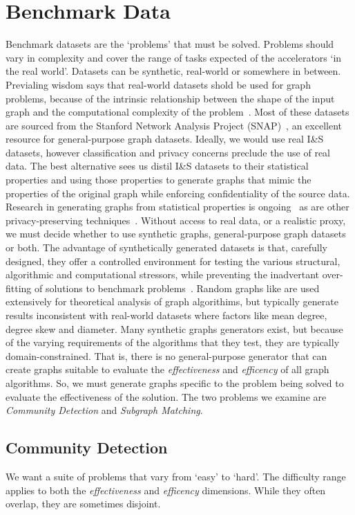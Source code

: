 \section{Benchmark Data}\label{section:datasets}
Benchmark datasets are the `problems' that must be solved.
Problems should vary in complexity and cover the range of tasks expected of the accelerators `in the real world'.
Datasets can be synthetic, real-world or somewhere in between.
Previaling wisdom says that real-world datasets shold be used for graph problems, because of the intrinsic relationship between the shape of the input graph and the computational complexity of the problem~\cite{Beamer2017}.
Most of these datasets are sourced from the Stanford Network Analysis Project (SNAP)~\cite{Leskovec2014}, an excellent resource for general-purpose graph datasets.
Ideally, we would use real I\&S datasets, however classification and privacy concerns preclude the use of real data. 
The best alternative sees us distil I\&S datasets to their statistical properties and using those properties to generate graphs that mimic the properties of the original graph while enforcing confidentiality of the source data. 
Research in generating graphs from statistical properties is ongoing~ as are other privacy-preserving techniques~.
Without access to real data, or a realistic proxy, we must decide whether to use synthetic graphs, general-purpose graph datasets or both. 
The advantage of synthetically generated datasets is that, carefully designed, they offer a controlled environment for testing the various structural, algorithmic and computational stressors, while preventing the inadvertant over-fitting of solutions to benchmark problems~\cite{Hooker1994,Hooker1995}. 
Random graphs like  are used extensively for theoretical analysis of graph algorithims, but typically generate results inconsistent with real-world datasets where factors like mean degree, degree skew and diameter. 
Many synthetic graphs generators exist, but because of the varying requirements of the algorithms that they test, they are typically domain-constrained. 
That is, there is no general-purpose generator that can create graphs suitable to evaluate the \textit{effectiveness} and \textit{efficency} of all graph algorithms. 
So, we must generate graphs specific to the problem being solved to evaluate the effectiveness of the solution. 
The two problems we examine are \textit{Community Detection} and \textit{Subgraph Matching}.

\subsection{Community Detection}
We want a suite of problems that vary from `easy' to `hard'.
The difficulty range applies to both the \textit{effectiveness} and \textit{efficency} dimensions. 
While they often overlap, they are sometimes disjoint. 

